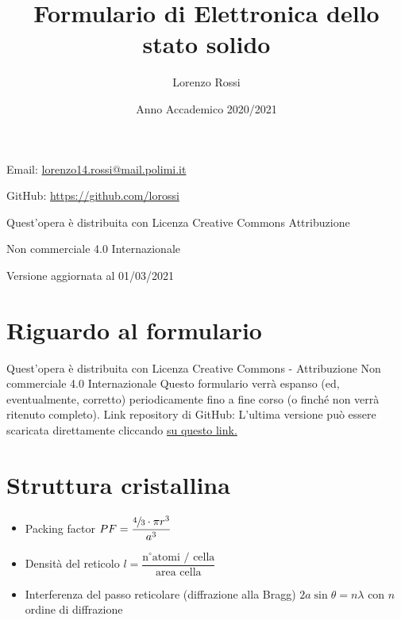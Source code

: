 \documentclass{article}
\title{\Huge Formulario di Elettronica dello stato solido}
\author{\LARGE Lorenzo Rossi}
\date{\LARGE Anno Accademico 2020/2021}
\begin{document}
\maketitle

\vspace{18em}

\large
\begin{doublespacing}\hypersetup{
	urlcolor=black,
}
\centerline{Email: \href{mailto://lorenzo14.rossi@mail.polimi.it}{lorenzo14.rossi@mail.polimi.it}}
\centerline{GitHub: \url{https://github.com/lorossi}}

\vspace{18em}
\centerline{Quest'opera è distribuita con Licenza Creative Commons Attribuzione}
\centerline{Non commerciale 4.0 Internazionale \ccbynceu}
\centerline{Versione aggiornata al 01/03/2021}
\end{doublespacing}
\newpage


\tableofcontents
\clearpage
{}
\newpage

\section{Riguardo al formulario}
Quest'opera è distribuita con Licenza Creative Commons - Attribuzione Non commerciale 4.0 Internazionale \ccbynceu \newline
Questo formulario verrà espanso (ed, eventualmente, corretto) periodicamente fino a fine corso (o finché non verrà ritenuto completo). \newline
Link repository di GitHub: \url{} \newline
L'ultima versione può essere scaricata direttamente cliccando \href{}{su questo link.}


\section{Struttura cristallina}
\begin{itemize}
	\item Packing factor \( PF = \dfrac{ \sfrac{4}{3} \cdot \pi r^3}{a^3} \)
	\item Densità del reticolo \( l = \dfrac{\text{n} ^ \circ \text{atomi / cella}}{\text{area cella}} \)
	\item Interferenza del passo reticolare (diffrazione alla Bragg) \(  2a \sin \theta = n \lambda \) con \( n \) ordine di diffrazione
\end{itemize}
\end{document}
